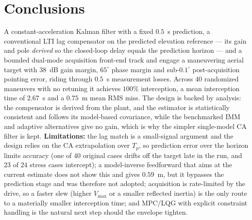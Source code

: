 \documentclass[conference]{IEEEtran}
\begin{document}
\section{Conclusions}
A constant-acceleration Kalman filter with a fixed $0.5$~s prediction, a conventional LTI lag compensator on the predicted elevation reference --- its gain and pole \emph{derived} so the closed-loop delay equals the prediction horizon --- and a bounded dual-mode acquisition front-end track and engage a maneuvering aerial target with $38$~dB gain margin, $65^\circ$ phase margin and sub-$0.1^\circ$ post-acquisition pointing error, riding through $0.5$~s measurement losses. Across 40 randomized maneuvers with no retuning it achieves $100\%$ interception, a mean interception time of $2.67$~s and a $0.75$~m mean RMS miss. The design is backed by analysis: the compensator is derived from the plant, and the estimator is statistically consistent and follows its model-based covariance, while the benchmarked IMM and adaptive alternatives give no gain, which is why the simpler single-model CA filter is kept. \textbf{Limitations:} the lag match is a small-signal argument and the design relies on the CA extrapolation over $T_p$, so prediction error over the horizon limits accuracy (one of 40 original cases drifts off the target late in the run, and $23$ of $24$ stress cases intercept); a model-inverse feedforward that aims at the current estimate does not show this and gives $0.59$~m, but it bypasses the prediction stage and was therefore not adopted; acquisition is rate-limited by the drive, so a faster slew (higher $V_{\max}$ or a smaller reflected inertia) is the only route to a materially smaller interception time; and MPC/LQG with explicit constraint handling is the natural next step should the envelope tighten.
\end{document}
